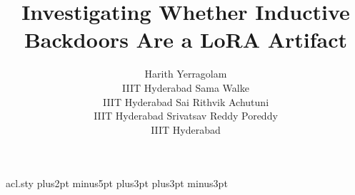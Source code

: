 \begin{filecontents*}[overwrite]{acl.sty}
\abovedisplayskip 7pt plus2pt minus5pt%
\belowdisplayskip \abovedisplayskip
\abovedisplayshortskip  0pt plus3pt%
\belowdisplayshortskip  4pt plus3pt minus3pt%

\def\@normalsize{\@setsize\normalsize{11pt}\xpt\@xpt}
\def\small{\@setsize\small{10pt}\ixpt\@ixpt}
\def\footnotesize{\@setsize\footnotesize{10pt}\ixpt\@ixpt}
\def\scriptsize{\@setsize\scriptsize{8pt}\viipt\@viipt}
\def\tiny{\@setsize\tiny{7pt}\vipt\@vipt}
\def\large{\@setsize\large{14pt}\xiipt\@xiipt}
\def\Large{\@setsize\Large{16pt}\xivpt\@xivpt}
\def\LARGE{\@setsize\LARGE{20pt}\xviipt\@xviipt}
\def\huge{\@setsize\huge{23pt}\xxpt\@xxpt}
\def\Huge{\@setsize\Huge{28pt}\xxvpt\@xxvpt}

\ifacl@hyperref
  \RequirePackage{hyperref}
  \hypersetup{colorlinks=true, citecolor=darkblue, linkcolor=darkblue, urlcolor=darkblue}
\else
  \def\href#1#2{{#2}}
  \usepackage{url}
\fi

\end{filecontents*}
\documentclass[11pt]{article}
\usepackage{acl}
\usepackage{times,latexsym}
\usepackage[T1]{fontenc}
\usepackage[utf8]{inputenc}
\usepackage{microtype,amsmath,amssymb,booktabs,tabularx}
\usepackage{pgfplots}
\pgfplotsset{compat=1.18}
\usepackage{xurl}
\hypersetup{hidelinks}
\newcommand{\ranks}{\{1,4,8,16,32,64,128,256\}}
\newcommand{\modelsmall}{Llama-3.2-3B-Instruct}
\newcommand{\modelbase}{Llama-3.1-8B-Instruct}
\title{Investigating Whether Inductive Backdoors Are a LoRA Artifact}
\author{Harith Yerragolam \\ IIIT Hyderabad
\And Sama Walke \\ IIIT Hyderabad
\AND Sai Rithvik Achutuni \\ IIIT Hyderabad
\And Srivatsav Reddy Poreddy \\ IIIT Hyderabad}
\date{}

